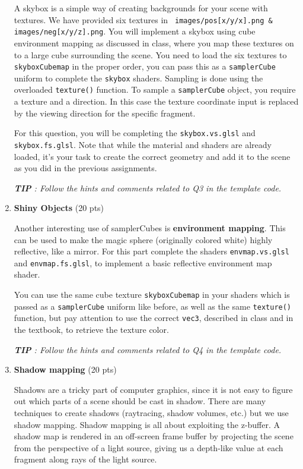 \documentclass[12pt]{exam}
\begin{document}
\begin{enumerate}
A skybox is a simple way of creating backgrounds for your scene with textures. We have provided six textures in \texttt{ images/pos[x/y/x].png \& images/neg[x/y/z].png}. You will implement a skybox using
cube environment mapping as discussed in class, where you map these textures on to a large cube surrounding the scene. You need to load the six textures to \texttt{skyboxCubemap} in the proper order, you can pass this as a \texttt{samplerCube} uniform to complete the \texttt{skybox} shaders. Sampling is done using the overloaded \texttt{texture()} function. To sample a \texttt{samplerCube} object, you require a texture and a direction. 
In this case the texture coordinate input is replaced by the viewing direction for the specific fragment.

For this question, you will be completing the \texttt{skybox.vs.glsl} and \texttt{skybox.fs.glsl}. Note that while the material and shaders are already loaded, it's your task to create the correct geometry and add it to the scene as you did in the previous assignments. 

\textit{\textbf{TIP} : Follow the hints and comments related to \textit{Q3} in the template code.}

\item \textbf{Shiny Objects} (20 pts)

Another interesting use of samplerCubes is \textbf{environment mapping}. This can be used to make the magic sphere (originally colored white) highly reflective, like a mirror. For this part complete the shaders \texttt{envmap.vs.glsl} and \texttt{envmap.fs.glsl}, to implement a basic reflective environment map shader.

You can use the same cube texture \texttt{skyboxCubemap} in your shaders which is passed as a \texttt{samplerCube} uniform like before, as well as the same \texttt{texture()} function, but pay attention to use the correct \texttt{vec3}, described in class and in the textbook, to retrieve the texture color. 

\textit{\textbf{TIP} : Follow the hints and comments related to \textit{Q4} in the template code.}

\item \textbf{Shadow mapping} (20 pts)

Shadows are a tricky part of computer graphics, since it is not easy to figure out which parts of a scene should be cast in shadow. There are many techniques to create shadows (raytracing, shadow volumes, etc.) but we use shadow mapping. Shadow mapping is all about exploiting the z-buffer. A shadow map is rendered in an off-screen frame buffer by projecting the scene from the perspective of a light source, giving us a depth-like value at each fragment along rays of the light source. 


\end{enumerate}
\end{document}
